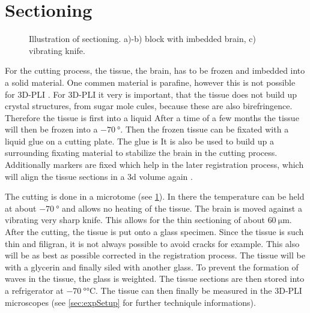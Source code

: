 \section{Sectioning}
%
\begin{figure}[!t]
	\centering
    \setlength{\tikzwidth}{0.75\textwidth}
	\caption{Illustration of sectioning. a)-b) block with imbedded brain, c) vibrating knife.}
	\label{fig:brain_sectioning}
\end{figure}
% 
For the cutting process, the tissue, \ie{} the brain, has to be frozen and imbedded into a solid material.
One commen material is parafine, however this is not possible for \ac{3D-PLI} \dummy[why?]{}.
For \ac{3D-PLI} it very is important, that the tissue does not build up crystal structures, \eg{} from sugar mole cules, because these are also birefringence.
Therefore the tissue is first \dummy{} into a \dummy{} liquid \dummy{}
After a time of a few months the tissue will then be frozen into a $\SI{-70}{\degree}$.
Then the frozen tissue can be fixated with a liquid glue on a cutting plate.
The glue is \dummy{}
It is also be used to build up a surrounding fixating material to stabilize the brain in the cutting process.
Additionally markers are fixed which help in the later registration process, which will align the tissue sections in a 3d volume again \cite{Schober2016,Ali2018,Schmitz2018}.
\par
% 
The cutting is done in a microtome (see \cref{fig:brain_sectioning}).
In there the temperature can be held at about $\SI{-70}{\degree}$ and allows no heating of the tissue.
The brain is moved against a vibrating very sharp knife.
This allows for the thin sectioning of about $\SI{60}{\micro\meter}$.
After the cutting, the tissue is put onto a glass specimen.
Since the tissue is such thin and filigran, it is not always possible to avoid cracks for example.
This also will be as best as possible corrected in the registration process.
The tissue will be \dummy{} with a glycerin \dummy{} and finally siled with another glass.
To prevent the formation of waves in the tissue, the glass is weighted.
The tissue sections are then stored into a refrigerator at $\SI{-70}{\degree\celsius}$.
The tissue can then finally be measured in the \ac{3D-PLI} microscopes (see \cref{sec:expSetup} for further techniqule informations).
% 
% 
